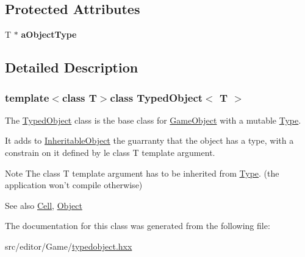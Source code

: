 \subsection*{\-Protected \-Attributes}
\begin{DoxyCompactItemize}
\item 
\hypertarget{class_typed_object_aa069c8f9698828c4b5775782cc369de5}{\-T $\ast$ {\bfseries a\-Object\-Type}}\label{class_typed_object_aa069c8f9698828c4b5775782cc369de5}

\end{DoxyCompactItemize}


\subsection{\-Detailed \-Description}
\subsubsection*{template$<$class \-T$>$class Typed\-Object$<$ T $>$}

\-The \hyperlink{class_typed_object}{\-Typed\-Object} class is the base class for \hyperlink{class_game_object}{\-Game\-Object} with a mutable \hyperlink{class_type}{\-Type}. 

\-It adds to \hyperlink{class_inheritable_object}{\-Inheritable\-Object} the guarranty that the object has a type, with a constrain on it defined by le {\ttfamily class} {\ttfamily \-T} template argument.

\begin{DoxyNote}{\-Note}
\-The {\ttfamily class} {\ttfamily \-T} template argument has to be inherited from \hyperlink{class_type}{\-Type}. (the application won't compile otherwise)
\end{DoxyNote}
\begin{DoxySeeAlso}{\-See also}
\hyperlink{class_cell}{\-Cell}, \hyperlink{class_object}{\-Object} 
\end{DoxySeeAlso}


\-The documentation for this class was generated from the following file\-:\begin{DoxyCompactItemize}
\item 
src/editor/\-Game/\hyperlink{typedobject_8hxx}{typedobject.\-hxx}\end{DoxyCompactItemize}
